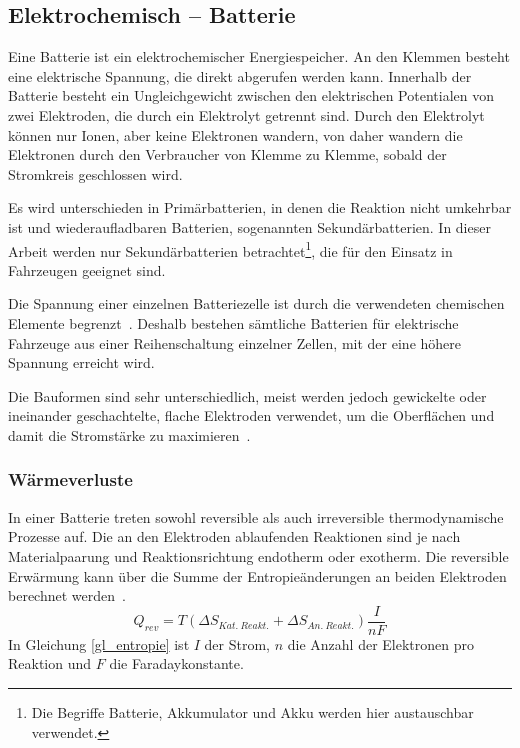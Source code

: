 \subsection{Elektrochemisch – Batterie}
Eine Batterie ist ein elektrochemischer Energiespeicher. An den Klemmen besteht eine elektrische Spannung, die direkt abgerufen werden kann. Innerhalb der Batterie besteht ein Ungleichgewicht zwischen den elektrischen Potentialen von zwei Elektroden, die durch ein Elektrolyt getrennt sind. Durch den Elektrolyt können nur Ionen, aber keine Elektronen wandern, von daher wandern die Elektronen durch den Verbraucher von Klemme zu Klemme, sobald der Stromkreis geschlossen wird.

Es wird unterschieden in Primärbatterien, in denen die Reaktion nicht umkehrbar ist und wiederaufladbaren Batterien, sogenannten Sekundärbatterien. In dieser Arbeit werden nur Sekundärbatterien betrachtet\footnote{Die Begriffe Batterie, Akkumulator und Akku werden hier austauschbar verwendet.}, die für den Einsatz in Fahrzeugen geeignet sind.

Die Spannung einer einzelnen Batteriezelle ist durch die verwendeten chemischen Elemente begrenzt~\cite[S. 202f]{Sterner:2014}. Deshalb bestehen sämtliche Batterien für elektrische Fahrzeuge aus einer Reihenschaltung einzelner Zellen, mit der eine höhere Spannung erreicht wird.

Die Bauformen sind sehr unterschiedlich, meist werden jedoch gewickelte oder ineinander geschachtelte, flache Elektroden verwendet, um die Oberflächen und damit die Stromstärke zu maximieren~\cite[S. 209ff]{Sterner:2014}.

\subsubsection{Wärmeverluste} \label{sec_waermeverluste}
In einer Batterie treten sowohl reversible als auch irreversible thermodynamische Prozesse auf. Die an den Elektroden ablaufenden Reaktionen sind je nach Materialpaarung und Reaktionsrichtung endotherm oder exotherm. Die reversible Erwärmung kann über die Summe der Entropieänderungen an beiden Elektroden berechnet werden~\cite[S. 21ff]{KiehneBattery}.
\begin{equation}\label{gl_entropie}
	Q_{rev}=T(\Delta S_{Kat.~Reakt.} + \Delta S_{An.~Reakt.}) \frac{I}{nF}	
\end{equation}
In Gleichung \ref{gl_entropie} ist $I$ der Strom, $n$ die Anzahl der Elektronen pro Reaktion und $F$ die Faradaykonstante. 


